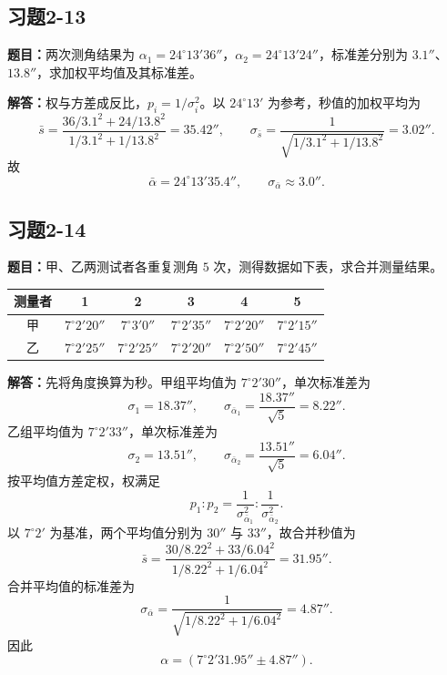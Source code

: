 \documentclass[UTF8,zihao=-4]{ctexart}
\newcommand{\problem}[1]{\subsection*{#1}}
\newcommand{\timu}{\noindent\textbf{题目：}}
\newcommand{\jieda}{\noindent\textbf{解答：}}
\begin{document}
{\problem{习题2-13}
\timu 两次测角结果为 $\alpha_1=24^\circ13'36''$，$\alpha_2=24^\circ13'24''$，标准差分别为 $3.1''$、$13.8''$，求加权平均值及其标准差。

\jieda 权与方差成反比，$p_i=1/\sigma_i^2$。以 $24^\circ13'$ 为参考，秒值的加权平均为
\begin{equation*}
    \bar{s}=\frac{36/3.1^2+24/13.8^2}{1/3.1^2+1/13.8^2}=35.42'',
    \qquad
    \sigma_{\bar{s}}=\frac{1}{\sqrt{1/3.1^2+1/13.8^2}}=3.02''.
\end{equation*}
故
\begin{equation*}
    \bar{\alpha}=24^\circ13'35.4'',\qquad \sigma_{\bar{\alpha}}\approx3.0''.
\end{equation*}

\problem{习题2-14}
\timu 甲、乙两测试者各重复测角 $5$ 次，测得数据如下表，求合并测量结果。

\begin{center}
\small
\begin{tabular}{c|ccccc}
\toprule
测量者 & 1 & 2 & 3 & 4 & 5\\
\midrule
甲 & $7^\circ2'20''$ & $7^\circ3'0''$ & $7^\circ2'35''$ & $7^\circ2'20''$ & $7^\circ2'15''$\\
乙 & $7^\circ2'25''$ & $7^\circ2'25''$ & $7^\circ2'20''$ & $7^\circ2'50''$ & $7^\circ2'45''$\\
\bottomrule
\end{tabular}
\end{center}

\jieda 先将角度换算为秒。甲组平均值为 $7^\circ2'30''$，单次标准差为
\begin{equation*}
    \sigma_1=18.37'',\qquad \sigma_{\bar{\alpha}_1}=\frac{18.37''}{\sqrt5}=8.22''.
\end{equation*}
乙组平均值为 $7^\circ2'33''$，单次标准差为
\begin{equation*}
    \sigma_2=13.51'',\qquad \sigma_{\bar{\alpha}_2}=\frac{13.51''}{\sqrt5}=6.04''.
\end{equation*}
按平均值方差定权，权满足
\begin{equation*}
    p_1:p_2=\frac{1}{\sigma_{\bar{\alpha}_1}^2}:\frac{1}{\sigma_{\bar{\alpha}_2}^2}.
\end{equation*}
以 $7^\circ2'$ 为基准，两个平均值分别为 $30''$ 与 $33''$，故合并秒值为
\begin{equation*}
    \bar{s}=\frac{30/8.22^2+33/6.04^2}{1/8.22^2+1/6.04^2}=31.95''.
\end{equation*}
合并平均值的标准差为
\begin{equation*}
    \sigma_{\bar{\alpha}}=\frac{1}{\sqrt{1/8.22^2+1/6.04^2}}=4.87''.
\end{equation*}
因此
\begin{equation*}
    \alpha=(7^\circ2'31.95''\pm4.87'').
\end{equation*}

}
\end{document}
